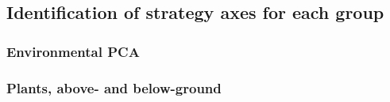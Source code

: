 \documentclass[
]{article}
\begin{document}
\hypertarget{identification-of-strategy-axes-for-each-group}{%
\subsection{Identification of strategy axes for each
group}\label{identification-of-strategy-axes-for-each-group}}

\hypertarget{environmental-pca}{%
\subsubsection{Environmental PCA}\label{environmental-pca}}

\hypertarget{plants-above--and-below-ground}{%
\subsubsection{Plants, above- and
below-ground}\label{plants-above--and-below-ground}}
\end{document}
